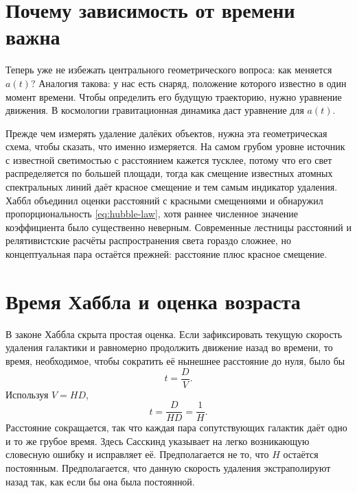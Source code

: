 \section{Почему зависимость от времени важна}

Теперь уже не избежать центрального геометрического вопроса: как меняется \(a(t)\)? Аналогия такова: у нас есть снаряд, положение которого известно в один момент времени. Чтобы определить его будущую траекторию, нужно уравнение движения. В космологии гравитационная динамика даст уравнение для \(a(t)\).

\begin{classroomqa}
\end{classroomqa}

Прежде чем измерять удаление далёких объектов, нужна эта геометрическая схема, чтобы сказать, что именно измеряется. На самом грубом уровне источник с известной светимостью с расстоянием кажется тусклее, потому что его свет распределяется по большей площади, тогда как смещение известных атомных спектральных линий даёт красное смещение и тем самым индикатор удаления. Хаббл объединил оценки расстояний с красными смещениями и обнаружил пропорциональность \eqref{eq:hubble-law}, хотя раннее численное значение коэффициента было существенно неверным. Современные лестницы расстояний и релятивистские расчёты распространения света гораздо сложнее, но концептуальная пара остаётся прежней: расстояние плюс красное смещение.

\section{Время Хаббла и оценка возраста}

В законе Хаббла скрыта простая оценка. Если зафиксировать текущую скорость удаления галактики и равномерно продолжить движение назад во времени, то время, необходимое, чтобы сократить её нынешнее расстояние до нуля, было бы
\begin{equation}
  t=\frac{D}{V}.
\end{equation}
Используя \(V=HD\),
\begin{equation}
  t=\frac{D}{HD}=\frac{1}{H}.
  \label{eq:hubble-time}
\end{equation}
Расстояние сокращается, так что каждая пара сопутствующих галактик даёт одно и то же грубое время. Здесь Сасскинд указывает на легко возникающую словесную ошибку и исправляет её. Предполагается не то, что \(H\) остаётся постоянным. Предполагается, что данную скорость удаления экстраполируют назад так, как если бы она была постоянной.

